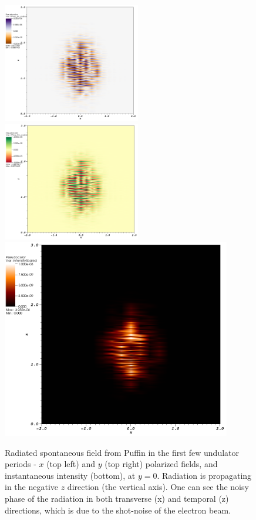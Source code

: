 \documentclass[12pt]{article}%
\begin{document}
\begin{figure}
\centering
\includegraphics[width=60mm]{visit0032.png}
\includegraphics[width=60mm]{visit0033.png}
\includegraphics[width=100mm]{visit0035.png}
\caption{Radiated spontaneous field from Puffin in the first few undulator periods - $x$ (top left) and $y$ (top right) polarized fields, and instantaneous intensity (bottom), at $y=0$. Radiation is propagating in the negative $z$ direction (the vertical axis). One can see the noisy phase of the radiation in both transverse (x) and temporal (z) directions, which is due to the shot-noise of the electron beam.  }
\label{bbd1}
\end{figure}
\end{document}
